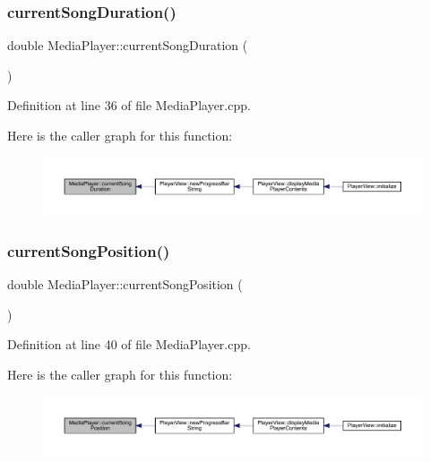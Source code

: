 \subsubsection{\texorpdfstring{current\+Song\+Duration()}{currentSongDuration()}}
{\footnotesize\ttfamily double Media\+Player\+::current\+Song\+Duration (\begin{DoxyParamCaption}{ }\end{DoxyParamCaption})}



Definition at line 36 of file Media\+Player.\+cpp.

Here is the caller graph for this function\+:
\nopagebreak
\begin{figure}[H]
\begin{center}
\leavevmode
\includegraphics[width=350pt]{class_media_player_a12c176a856cba35eff631cca707bd97b_icgraph}
\end{center}
\end{figure}
\mbox{\label{class_media_player_abe3dbd56c114f320b5bd3e293f55f246}} 
\subsubsection{\texorpdfstring{current\+Song\+Position()}{currentSongPosition()}}
{\footnotesize\ttfamily double Media\+Player\+::current\+Song\+Position (\begin{DoxyParamCaption}{ }\end{DoxyParamCaption})}



Definition at line 40 of file Media\+Player.\+cpp.

Here is the caller graph for this function\+:
\nopagebreak
\begin{figure}[H]
\begin{center}
\leavevmode
\includegraphics[width=350pt]{class_media_player_abe3dbd56c114f320b5bd3e293f55f246_icgraph}
\end{center}
\end{figure}
\mbox{\label{class_media_player_a435a05fd0a11295f8c9be09d7b82abe8}} 
